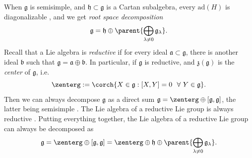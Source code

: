 When \(\mathfrak{g}\) is semisimple, and \(\mathfrak{h}\subset\mathfrak{g}\) is a Cartan subalgebra, every \(\mathrm{ad}(H)\) is diagonalizable \parencite[Prop. 6.3.2]{hilgert2011structure}, and we get \textit{root space decomposition}
\[
\mathfrak{g} = \mathfrak{h} \oplus \parent{\bigoplus_{\lambda \neq 0} \mathfrak{g}_\lambda}.
\]
Recall that a Lie algebra is \textit{reductive} if for every ideal \(\mathfrak{a}\subset \mathfrak{g}\), there is another ideal \(\mathfrak{b}\) such that \(\mathfrak{g}=\mathfrak{a} \oplus \mathfrak{b}\). In particular, if \(\mathfrak{g}\) is reductive, and \(\mathfrak{z}(\mathfrak{g})\) is the \textit{center} of \(\mathfrak{g}\), i.e.
\[
\zenterg:=\corch{X \in \mathfrak{g}: [X,Y]=0 \ \ \forall \ Y \in \mathfrak{g}}.
\]
Then we can always decompose \(\mathfrak{g}\) as a direct sum \(\mathfrak{g}=\zenterg \oplus [\mathfrak{g}, \mathfrak{g}]\), the latter being semisimple \parencite[Lemma 5.7.2]{hilgert2011structure}. The Lie algebra of a reductive Lie group is always reductive \parencite[Remark 15.2.8]{hilgert2011structure}. Putting everything together, the Lie algebra of a reductive Lie group can always be decomposed as
\[
\mathfrak{g}=\zenterg \oplus [\mathfrak{g}, \mathfrak{g}]=\zenterg \oplus \mathfrak{h} \oplus \parent{\bigoplus_{\lambda \neq 0} \mathfrak{g}_\lambda}.
\]


